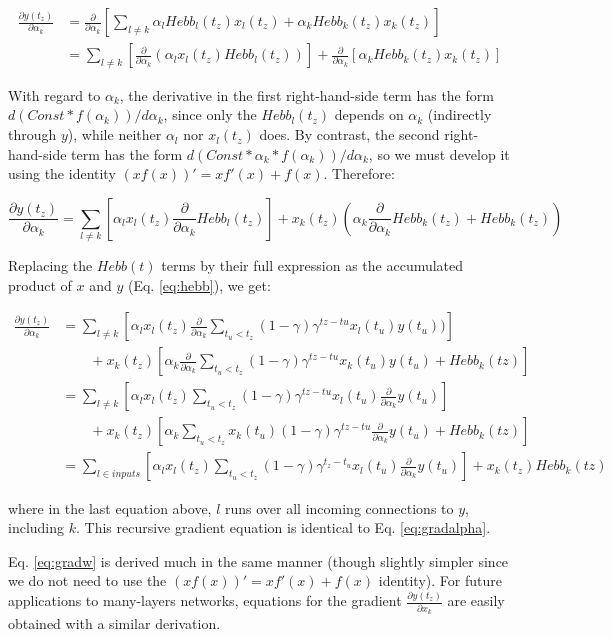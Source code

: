 \documentclass{article}
\begin{document}
\begin{align}
\frac{\partial y(t_z)}{\partial \alpha_k} &= \frac{\partial }{\partial \alpha_k}[
\sum_{l \neq k }\alpha_l Hebb_l(t_z) x_l(t_z) + \alpha_k Hebb_k(t_z) x_k(t_z)]\\
&= \sum_{l \neq k }[\frac{\partial }{\partial \alpha_k} (\alpha_l x_l(t_z) Hebb_l(t_z))] + \frac{\partial }{\partial \alpha_k}[\alpha_k Hebb_k(t_z) x_k(t_z)]
\end{align}

With regard to $\alpha_k$, the derivative in the first right-hand-side term has the
form $d(Const*f(\alpha_k))/d\alpha_k$, since only the $Hebb_l(t_z)$ depends on $\alpha_k$
(indirectly through $y$), while neither $\alpha_l$ nor $x_l(t_z)$ does. By contrast, the second right-hand-side term has the
form $d(Const*\alpha_k*f(\alpha_k))/d\alpha_k$, so we must develop it using the identity
$(xf(x))'=xf'(x)+f(x)$. Therefore:

\[
\frac{\partial y(t_z)}{\partial \alpha_k} = \sum_{l \neq k }[\alpha_l
x_l(t_z)\frac{\partial }{\partial \alpha_k}Hebb_l(t_z)] +
x_k(t_z)(\alpha_k\frac{\partial }{\partial \alpha_k}Hebb_k(t_z) + Hebb_k(t_z))
\]

Replacing the $Hebb(t)$ terms by their full expression as the accumulated product of $x$ and
$y$ (Eq. \ref{eq:hebb}), we get:

\begin{align}
\frac{\partial y(t_z)}{\partial \alpha_k} &= \sum_{l \neq k }[\alpha_l x_l(t_z) \frac{\partial }{\partial
\alpha_k}\sum_{t_u < t_z}(1-\gamma)\gamma^{tz-tu}x_l(t_u)y(t_u))] \nonumber \\ 
& \qquad {} + x_k(t_z)[\alpha_k\frac{\partial}{\partial \alpha_k}\sum_{t_u <
t_z}(1-\gamma)\gamma^{tz-tu}x_k(t_u)y(t_u) + Hebb_k(tz)]\\
&= \sum_{l \neq k }[\alpha_l x_l(t_z) \sum_{t_u < t_z}(1-\gamma)\gamma^{tz-tu}x_l(t_u)\frac{\partial }{\partial
\alpha_k}y(t_u)] \nonumber \\
& \qquad {} + x_k(t_z)[\alpha_k\sum_{t_u <
t_z}x_k(t_u)(1-\gamma)\gamma^{tz-tu}\frac{\partial}{\partial \alpha_k}y(t_u) + Hebb_k(tz)]\\
&= \sum_{l \in inputs}[\alpha_l x_l(t_z)\sum_{t_u <
t_z}(1-\gamma)\gamma^{t_z-t_u}x_l(t_u)\frac{\partial
}{\partial
\alpha_k}y(t_u)] +
x_k(t_z)Hebb_k(tz)
\end{align}


where in the last equation above, $l$ runs over all incoming connections to $y$,
including $k$. This recursive gradient equation is identical to Eq.
\ref{eq:gradalpha}.

Eq. \ref{eq:gradw} is derived much in the same manner (though slightly simpler
since we do not need to use the $(xf(x))'=xf'(x)+f(x)$ identity). For future applications to
many-layers networks, equations for the gradient
$\frac{\partial y(t_z)}{\partial x_k}$ are easily obtained with a similar
derivation.

\small
\printbibliography
\end{document}
